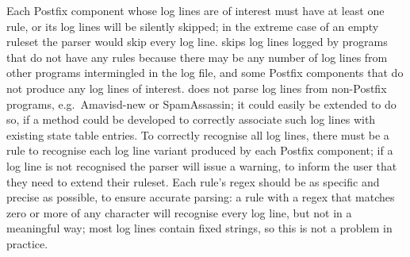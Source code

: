 Each Postfix component whose log lines are of interest must have at least
one rule, or its log lines will be silently skipped; in the extreme case of
an empty ruleset the parser would skip every log line.  \parsername{} skips
log lines logged by programs that do not have any rules because there may
be any number of log lines from other programs intermingled in the log
file, and some Postfix components that do not produce any log lines of
interest.  \parsername{} does not parse log lines from non-Postfix
programs, e.g.\ Amavisd-new or SpamAssassin; it could easily be extended to
do so, if a method could be developed to correctly associate such log lines
with existing state table entries.  To correctly recognise all log lines,
there must be a rule to recognise each log line variant produced by each
Postfix component; if a log line is not recognised the parser will issue a
warning, to inform the user that they need to extend their ruleset.  Each
rule's regex should be as specific and precise as possible, to ensure
accurate parsing: a rule with a regex that matches zero or more of any
character will recognise every log line, but not in a meaningful way; most
log lines contain fixed strings, so this is not a problem in practice.

